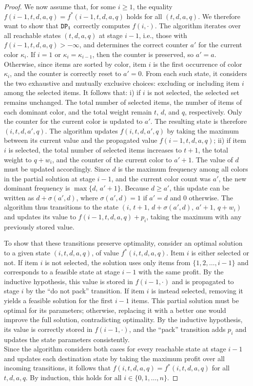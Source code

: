 \documentclass[10pt,a4paper]{amsart}
\newcommand{\firstDP}{{\tt DP_1}}
\newcommand{\profit}{p}
\newcommand{\weight}{w}
\begin{document}
\begin{proof}
We now assume that, for some $i \ge 1$, the equality $f(i-1,t,d,a,q) = f^*(i-1,t,d,a,q)$ holds for all $(t,d,a,q)$. We therefore want to show that $\firstDP$ correctly computes $f(i,\cdot)$.
The algorithm iterates over all reachable states $(t,d,a,q)$ at stage $i-1$, i.e., those with $f(i-1,t,d,a,q) > -\infty$, and determines the correct counter $a'$ for the current color $\kappa_i$. 
If $i=1$ or $\kappa_i = \kappa_{i-1}$, then the counter is preserved, so $a' = a$. 
Otherwise, since items are sorted by color, item $i$
is the first occurrence of color $\kappa_i$, and the counter is correctly reset to $a' = 0$. 
From each such state, it considers the two exhaustive and mutually exclusive choices: excluding or including item $i$ among the selected items. 
It follows that: 
i) if $i$ is not selected, the selected set remains unchanged. The total number of selected items, the number of items of each dominant color, and the total weight remain $t$, $d$, and $q$, respectively. Only the counter for the current color is updated to $a'$. The resulting state is therefore $(i,t,d,a',q)$. The algorithm updates $f(i,t,d,a',q)$ by taking the maximum between its current value and the propagated value $f(i-1,t,d,a,q)$; 
ii) if item $i$ is selected, the total number of selected items increases to $t+1$, the total weight to $q+\weight_i$, and the counter of the current color to $a'+1$. 
The value of $d$ must be updated accordingly. 
Since $d$ is the maximum frequency among all colors in the partial solution at stage $i-1$, and the current color count was $a'$, the new dominant frequency is $\max\{d,\, a'+1\}$. 
Because $d \ge a'$, this update can be written as $d + \sigma(a',d)$, where
$\sigma(a',d) = 1$ if $a' = d$ and $0$ otherwise. 
The algorithm thus transitions to the state $(i,\, t+1,\, d+\sigma(a',d),\, a'+1,\, q+\weight_i)$ and updates its value to $f(i-1,t,d,a,q) + \profit_i$, taking the maximum with any previously stored value.

\smallskip

To show that these transitions preserve optimality, consider an optimal solution to a given state $(i,t,d,a,q)$, of value $f^*(i,t,d,a,q)$. 
Item $i$ is either selected or not. 
If item $i$ is not selected, the solution uses only items from $\{1, 2,\dots,i-1\}$ and corresponds to a feasible state at stage $i-1$ with the same profit. 
By the inductive hypothesis, this value is stored in $f(i-1,\cdot)$ and is propagated to stage $i$ by the ``do not pack'' transition.
If item $i$ is instead selected, removing it yields a feasible solution for the first $i-1$ items. 
This partial solution must be optimal for its parameters; otherwise, replacing it with a better one would improve the full solution, contradicting optimality. 
By the inductive hypothesis, its value is correctly stored in $f(i-1,\cdot)$, and the ``pack'' transition adds
$\profit_i$ and updates the state parameters consistently.\\
Since the algorithm considers both cases for every reachable state at stage $i-1$ and updates each destination state by taking the maximum profit over all incoming transitions, it follows that $f(i,t,d,a,q) = f^*(i,t,d,a,q)$ for all $t,d,a,q$.
By induction, this holds for all $i \in \{0,1,\dots,n\}$.


\end{proof}
\end{document}
